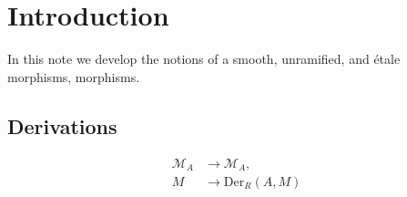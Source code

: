 \documentclass[12pt,twoside]{amsart}
\begin{document}
\section{Introduction}
In this note we develop the notions of a smooth, unramified, and \'{e}tale morphisms, morphisms.
\subsection{Derivations}
\begin{align*}
\mathcal{M}_A		&\rightarrow \mathcal{M}_A,\\
	M		&\rightarrow \mathrm{Der}_R(A,M)
\end{align*}
\end{document}
